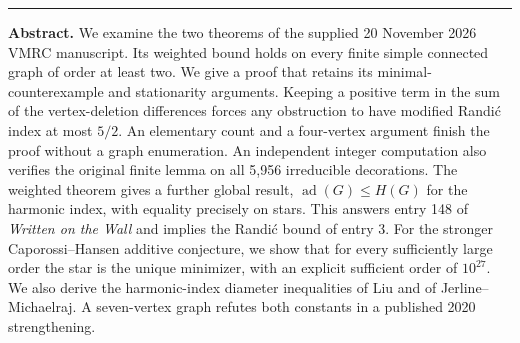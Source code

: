 \documentclass[11pt,a4paper]{article}
\theoremstyle{remark}\newtheorem*{remark}{Remark}
\newcommand{\ad}{\operatorname{ad}}
\begin{document}
\thispagestyle{plain}
\par
\vspace{8pt}
\par
\vspace{6pt}
\par
\vspace{8pt}
\par
\vspace{8pt}\hrule\vspace{10pt}
\noindent\textbf{Abstract.}
We examine the two theorems of the supplied 20 November 2026 VMRC manuscript. Its weighted bound holds on every finite simple connected graph of order at least two. We give a proof that retains its minimal-counterexample and stationarity arguments. Keeping a positive term in the sum of the vertex-deletion differences forces any obstruction to have modified Randi\'c index at most $5/2$. An elementary count and a four-vertex argument finish the proof without a graph enumeration. An independent integer computation also verifies the original finite lemma on all 5,956 irreducible decorations.
The weighted theorem gives a further global result, $\ad(G)\le H(G)$ for the harmonic index, with equality precisely on stars. This answers entry 148 of \emph{Written on the Wall} and implies the Randi\'c bound of entry 3. For the stronger Caporossi--Hansen additive conjecture, we show that for every sufficiently large order the star is the unique minimizer, with an explicit sufficient order of $10^{27}$. We also derive the harmonic-index diameter inequalities of Liu and of Jerline--Michaelraj. A seven-vertex graph refutes both constants in a published 2020 strengthening.
\end{document}
